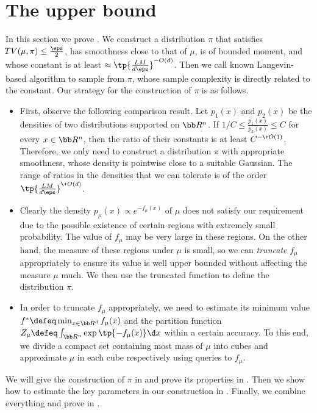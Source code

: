 \section{The upper bound}\label{sec:ub}

In this section we prove . We construct a distribution $\pi$  that satisfies $\DTV(\mu,\pi)\le \frac{\eps}{2}$, has smoothness close to that of $\mu$, is of bounded moment, and whose \Poincare constant is at least $\approx \tp{\frac{LM}{d\eps}}^{-O(d)}$. Then we call known Langevin-based algorithm to sample from $\pi$, whose sample complexity is directly related to the \Poincare constant. Our strategy for the construction of $\pi$ is as follows.

\begin{itemize}
    \item First, observe the following comparison result. Let $p_1(x)$ and $p_2(x)$ be the densities of two distributions supported on $\bb R^n$. If $1/C\le \frac{p_1(x)}{p_2(x)}\le C$ for every $x\in \bb R^n$, then the ratio of their \Poincare constants is at least $C^{-\+O(1)}$. Therefore, we only need to construct a distribution $\pi$ with appropriate smoothness, whose density is pointwise close to a suitable Gaussian. The range of ratios in the densities that we can tolerate is of the order $\tp{\frac{LM}{d\eps}}^{\+O(d)}$.
    \item Clearly the density $p_\mu(x)\propto e^{-f_\mu(x)}$ of $\mu$ does not satisfy our requirement due to the possible existence of certain regions with extremely small probability. The value of $f_\mu$ may be very large in these regions. On the other hand, the measure of these regions under $\mu$ is small, so we can \emph{truncate} $f_\mu$ appropriately to ensure its value is well upper bounded without affecting the measure $\mu$ much. We then use the truncated function to define the distribution $\pi$.
    \item In order to truncate $f_\mu$ appropriately, we need to estimate its minimum value $f^*\defeq \min_{x\in\bb R^d} f_\mu(x)$ and the partition function $Z_\mu \defeq \int_{\bb R^n} \exp\tp{-f_\mu(x)} \d x$ within a certain accuracy. To this end, we divide a compact set containing most mass of $\mu$ into cubes and approximate $\mu$ in each cube respectively using queries to $f_\mu$.
\end{itemize}

We will give the construction of $\pi$ in  and prove its properties in . Then we show how to estimate the key parameters in our construction in . Finally, we combine everything and prove  in .

